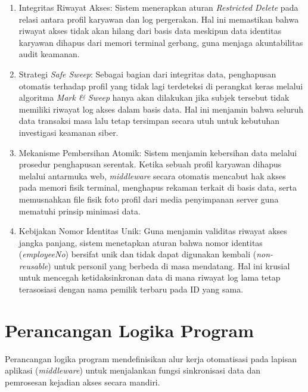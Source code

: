 

\begin{enumerate}
    \item Integritas Riwayat Akses: Sistem menerapkan aturan \textit{Restricted Delete} pada relasi antara profil karyawan dan log pergerakan. Hal ini memastikan bahwa riwayat akses tidak akan hilang dari basis data meskipun data identitas karyawan dihapus dari memori terminal gerbang, guna menjaga akuntabilitas audit keamanan.
    \item Strategi \textit{Safe Sweep}: Sebagai bagian dari integritas data, penghapusan otomatis terhadap profil yang tidak lagi terdeteksi di perangkat keras melalui algoritma \textit{Mark \& Sweep} hanya akan dilakukan jika subjek tersebut tidak memiliki riwayat log akses dalam basis data. Hal ini menjamin bahwa seluruh data transaksi masa lalu tetap tersimpan secara utuh untuk kebutuhan investigasi keamanan siber.
    \item Mekanisme Pembersihan Atomik: Sistem menjamin kebersihan data melalui prosedur penghapusan serentak. Ketika sebuah profil karyawan dihapus melalui antarmuka web, \textit{middleware} secara otomatis mencabut hak akses pada memori fisik terminal, menghapus rekaman terkait di basis data, serta memusnahkan file fisik foto profil dari media penyimpanan server guna mematuhi prinsip minimasi data.
    \item Kebijakan Nomor Identitas Unik: Guna menjamin validitas riwayat akses jangka panjang, sistem menetapkan aturan bahwa nomor identitas (\textit{employeeNo}) bersifat unik dan tidak dapat digunakan kembali (\textit{non-reusable}) untuk personil yang berbeda di masa mendatang. Hal ini krusial untuk mencegah ketidaksinkronan data di mana riwayat log lama tetap terasosiasi dengan nama pemilik terbaru pada ID yang sama.
\end{enumerate}

\section{Perancangan Logika Program}
Perancangan logika program mendefinisikan alur kerja otomatisasi pada lapisan aplikasi (\textit{middleware}) untuk menjalankan fungsi sinkronisasi data dan pemrosesan kejadian akses secara mandiri.

